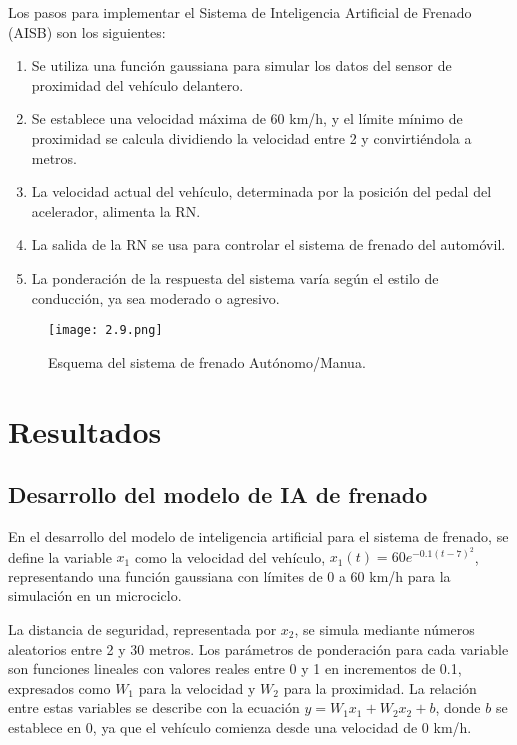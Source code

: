 \documentclass[9pt,twocolumn,twoside]{article} %
\begin{document}
Los pasos para implementar el Sistema de Inteligencia Artificial de Frenado (AISB) son los siguientes:

\begin{enumerate}
    \item Se utiliza una función gaussiana para simular los datos del sensor de proximidad del vehículo delantero.
    \item Se establece una velocidad máxima de 60 km/h, y el límite mínimo de proximidad se calcula dividiendo la velocidad entre 2 y convirtiéndola a metros.
    \item La velocidad actual del vehículo, determinada por la posición del pedal del acelerador, alimenta la RN.
    \item La salida de la RN se usa para controlar el sistema de frenado del automóvil.
    \item La ponderación de la respuesta del sistema varía según el estilo de conducción, ya sea moderado o agresivo.
\end{enumerate}

\begin{figure}[!htb]
\centering
\texttt{[image: 2.9.png]}
\caption{Esquema del sistema de frenado Autónomo/Manua.}
\label{simulación}
\end{figure}

\section{Resultados}
\subsection{\textbf{Desarrollo del modelo de IA de frenado}}

En el desarrollo del modelo de inteligencia artificial para el sistema de frenado, se define la variable \(x_1\) como la velocidad del vehículo, \(x_1(t) = 60e^{-0.1(t-7)^2}\), representando una función gaussiana con límites de 0 a 60 km/h para la simulación en un microciclo.

La distancia de seguridad, representada por \(x_2\), se simula mediante números aleatorios entre 2 y 30 metros. Los parámetros de ponderación para cada variable son funciones lineales con valores reales entre 0 y 1 en incrementos de 0.1, expresados como \(W_1\) para la velocidad y \(W_2\) para la proximidad. La relación entre estas variables se describe con la ecuación \(y = W_1x_1 + W_2x_2 + b\), donde \(b\) se establece en 0, ya que el vehículo comienza desde una velocidad de 0 km/h.
\end{document}
